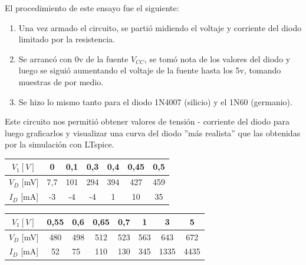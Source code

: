 
El procedimiento de este ensayo fue el siguiente:
\begin{enumerate}
    \item   Una vez armado el circuito, se partió midiendo el voltaje y corriente del diodo limitado por la resistencia.
    \item   Se arrancó con 0v de la fuente $V_{CC}$, se tomó nota de los valores del diodo y luego se siguió aumentando el voltaje de la fuente hasta los 5v, tomando muestras de por medio.
    \item   Se hizo lo mismo tanto para el diodo 1N4007 (silicio) y el 1N60 (germanio).
\end{enumerate}

\sangria{} Este circuito nos permitió obtener valores de tensión - corriente del diodo para luego graficarlos y visualizar una curva del diodo ''más realista'' que las obtenidas por la simulación con LTspice.
\thispagestyle{fancy}

\begin{center}
    \renewcommand{\arraystretch}{1.25}
    \begin{tabular}{|c|c|c|c|c|c|c|}
    \hline
    \rowcolor[HTML]{FFFFC7} 
    $V_1 [V]$                              & 0   & 0,1 & 0,3 & 0,4 & 0,45 & 0,5 \\ \hline
    \cellcolor[HTML]{FFFC9E}$V_D$ {[}mV{]} & 7,7 & 101 & 294 & 394 & 427  & 459 \\ \hline
    \cellcolor[HTML]{FFCE93}$I_D$ {[}mA{]} & -3  & -4  & -4  & 1   & 10   & 35  \\ \hline
    \end{tabular}
    \par\vspace{10pt}\par
    \small
    \begin{tabular}{|c|c|lc|c|c|c|c|}
    \hline
    \rowcolor[HTML]{FFFFC7} 
    $V_1 [V]$                              & 0,55 & \multicolumn{1}{l|}{\cellcolor[HTML]{FFFFC7}0,6} & 0,65 & 0,7 & 1   & 3    & 5    \\ \hline
    \cellcolor[HTML]{FFFC9E}$V_D$ {[}mV{]} & 480  & 498                                              & 512  & 523 & 563 & 643  & 672  \\ \hline
    \cellcolor[HTML]{FFCE93}$I_D$ {[}mA{]} & 52   & 75                                               & 110  & 130 & 345 & 1335 & 4435 \\ \hline
    \end{tabular}
\end{center}


